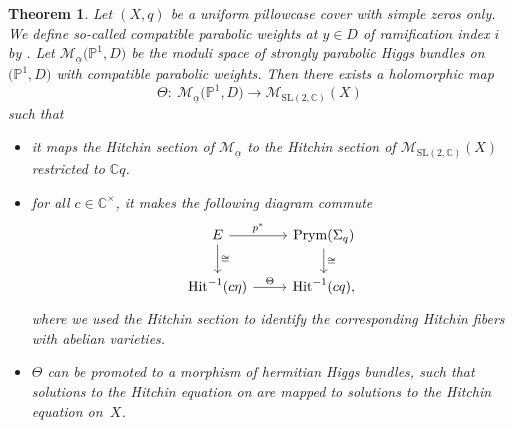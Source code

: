 \documentclass[10pt,a4paper]{amsart}
\numberwithin{equation}{section}
\newtheorem{theo}{Theorem}[section]
\theoremstyle{definition}
\renewcommand{\to}{\rightarrow}
\newcommand{\ualpha}{\underline{\alpha}}
\newcommand{\calM}{\mathcal{M}}
\newcommand{\CC}{\mathbb{C}}
\newcommand{\PP}{\mathbb{P}}
\newcommand{\Prym}{\mathrm{Prym}}
\newcommand{\Hit}{\mathrm{Hit}}
\newcommand{\SL}{\mathrm{SL}}
\begin{document}
\begin{theo}\label{theo:Theta}
 Let $(X,q)$ be a uniform pillowcase cover with simple zeros only. We define so-called compatible parabolic weights at $y \in D$ of ramification index $i$ by . Let $\calM_{\ualpha}\bigl(\PP^1,D\bigr)$ be the moduli space of strongly parabolic Higgs bundles on $\bigl(\PP^1,D\bigr)$ with compatible parabolic weights. Then there exists a holomorphic map
 \[ \Theta\colon \ \calM_{\ualpha}\bigl(\PP^1,D\bigr) \to \calM_{\SL(2,\CC)}(X)
 \] such that
 \begin{itemize}\itemsep=0pt
 \item[$(i)$] it maps the Hitchin section of $\calM_{\ualpha}$ to the Hitchin section of $\calM_{\SL(2,\CC)}(X)$ restricted to $\CC q$.
 \item[$(ii)$] for all $c \in \CC^\times$, it makes the following diagram commute
 \[ \begin{tikzcd} E \ar[r,"p^*"]\ar[d,"\cong"] & \Prym(\Sigma_q) \ar[d,"\cong"] \\
 \Hit^{-1}(c\eta) \ar[r,"\Theta"] & \Hit^{-1}(cq),
 \end{tikzcd} \]
 where we used the Hitchin section to identify the corresponding Hitchin fibers with abelian varieties.
 \item[$(iii)$] $\Theta$ can be promoted to a morphism of hermitian Higgs bundles, such that solutions to the Hitchin equation on \smash{$\bigl(\PP^1,D\bigr)$} are mapped to solutions to the Hitchin equation on~$X$.
 \end{itemize}
\end{theo}
\end{document}
